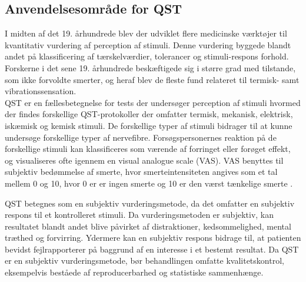 \subsection{Anvendelsesområde for QST}
I midten af det 19. århundrede blev der udviklet flere medicinske værktøjer til kvantitativ vurdering af perception af stimuli. Denne vurdering byggede blandt andet på klassificering af tærskelværdier, tolerancer og stimuli-respons forhold. \citep{Yarnitsky1997} Forskerne i det sene 19. århundrede beskæftigede sig i større grad med tilstande, som ikke forvoldte smerter, og heraf blev de fleste fund relateret til termisk- samt vibrationssensation. \citep{Yarnitsky1997}\\
QST er en fællesbetegnelse for tests der undersøger perception af stimuli hvormed der findes forskellige QST-protokoller der omfatter termisk, mekanisk, elektrisk, iskæmisk og kemisk stimuli. \citep{Yarnitsky2006} De forskellige typer af stimuli bidrager til at kunne undersøge forskellige typer af nervefibre. Forsøgspersonernes reaktion på de forskellige stimuli kan klassificeres som værende af forringet eller forøget effekt, og visualiseres ofte igennem en visual analogue scale (VAS). \citep{Yarnitsky2006} VAS benyttes til subjektiv bedømmelse af smerte, hvor smerteintensiteten angives som et tal mellem 0 og 10, hvor 0 er er ingen smerte og 10 er den værst tænkelige smerte \citep{smerter}. 

QST betegnes som en subjektiv vurderingsmetode, da det omfatter en subjektiv respons til et kontrolleret stimuli. \citep{Mucke2016} Da vurderingsmetoden er subjektiv, kan resultatet blandt andet blive påvirket af distraktioner, kedsommelighed, mental træthed og forvirring. Ydermere kan en subjektiv respons bidrage til, at patienten bevidst fejlrapporterer på baggrund af en interesse i et bestemt resultat. \citep{Yarnitsky2006} Da QST er en subjektiv vurderingsmetode, bør behandlingen omfatte kvalitetskontrol, eksempelvis beståede af reproducerbarhed og statistiske sammenhænge.

